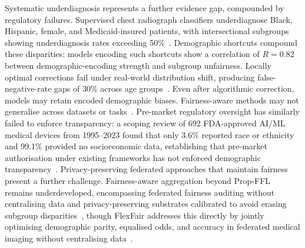 Systematic underdiagnosis represents a further evidence gap, compounded by regulatory failures. Supervised chest radiograph classifiers underdiagnose Black, Hispanic, female, and Medicaid-insured patients, with intersectional subgroups showing underdiagnosis rates exceeding 50\%~\citep{seyyedkalantari2021underdiagnosis}. Demographic shortcuts compound these disparities: models encoding such shortcuts show a correlation of $R{=}0.82$ between demographic-encoding strength and subgroup unfairness. Locally optimal corrections fail under real-world distribution shift, producing false-negative-rate gaps of 30\% across age groups~\citep{yang2024limits}. Even after algorithmic correction, models may retain encoded demographic biases. Fairness-aware methods may not generalise across datasets or tasks~\citep{yang2024limits}. Pre-market regulatory oversight has similarly failed to enforce transparency: a scoping review of 692 FDA-approved AI/ML medical devices from 1995--2023 found that only 3.6\% reported race or ethnicity and 99.1\% provided no socioeconomic data, establishing that pre-market authorisation under existing frameworks has not enforced demographic transparency~\citep{muralidharan2024fda}. Privacy-preserving federated approaches that maintain fairness present a further challenge. Fairness-aware aggregation beyond Prop-FFL~\citep{hosseini2023proportionally} remains underdeveloped, encompassing federated fairness auditing without centralising data and privacy-preserving substrates calibrated to avoid erasing subgroup disparities~\citep{lu2022federated}, though FlexFair addresses this directly by jointly optimising demographic parity, equalised odds, and accuracy in federated medical imaging without centralising data~\citep{xing2025flexfair}.

